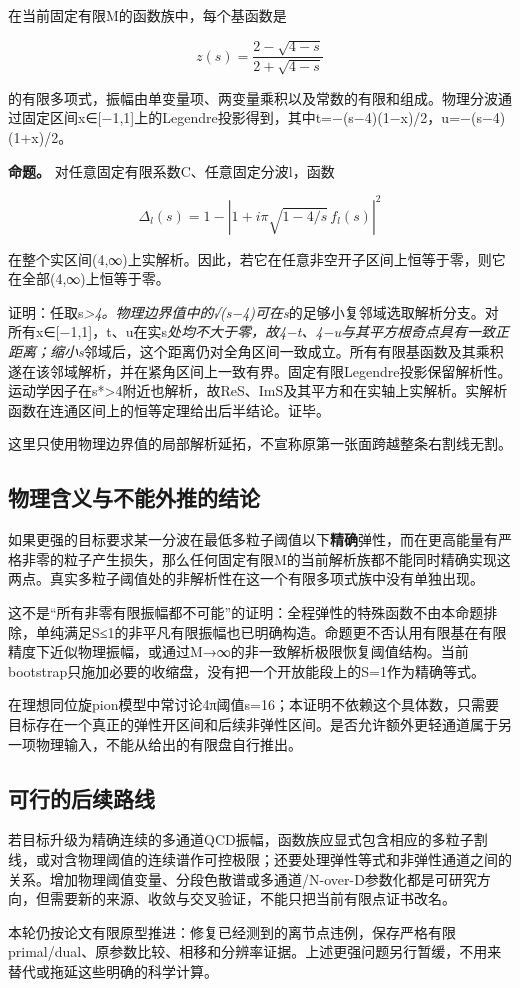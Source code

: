 \documentclass[
  10pt,
  a4paper,
]{article}
\begin{document}
在当前固定有限M的函数族中，每个基函数是

\[
z(s)=\frac{2-\sqrt{4-s}}{2+\sqrt{4-s}}
\]

的有限多项式，振幅由单变量项、两变量乘积以及常数的有限和组成。物理分波通过固定区间x∈{[}−1,1{]}上的Legendre投影得到，其中t=−(s−4)(1−x)/2，u=−(s−4)(1+x)/2。

\textbf{命题。} 对任意固定有限系数C、任意固定分波l，函数

\[
\Delta_l(s)=1-|1+i\pi\sqrt{1-4/s}\,f_l(s)|^2
\]

在整个实区间(4,∞)上实解析。因此，若它在任意非空开子区间上恒等于零，则它在全部(4,∞)上恒等于零。

证明：任取s\emph{\textgreater4。物理边界值中的√(s−4)可在s}的足够小复邻域选取解析分支。对所有x∈{[}−1,1{]}，t、u在实s\emph{处均不大于零，故4−t、4−u与其平方根奇点具有一致正距离；缩小s}邻域后，这个距离仍对全角区间一致成立。所有有限基函数及其乘积遂在该邻域解析，并在紧角区间上一致有界。固定有限Legendre投影保留解析性。运动学因子在s*\textgreater4附近也解析，故ReS、ImS及其平方和在实轴上实解析。实解析函数在连通区间上的恒等定理给出后半结论。证毕。

这里只使用物理边界值的局部解析延拓，不宣称原第一张面跨越整条右割线无割。

\subsection{物理含义与不能外推的结论}\label{ux7269ux7406ux542bux4e49ux4e0eux4e0dux80fdux5916ux63a8ux7684ux7ed3ux8bba}

如果更强的目标要求某一分波在最低多粒子阈值以下\textbf{精确}弹性，而在更高能量有严格非零的粒子产生损失，那么任何固定有限M的当前解析族都不能同时精确实现这两点。真实多粒子阈值处的非解析性在这一个有限多项式族中没有单独出现。

这不是``所有非零有限振幅都不可能''的证明：全程弹性的特殊函数不由本命题排除，单纯满足\textbar S\textbar≤1的非平凡有限振幅也已明确构造。命题更不否认用有限基在有限精度下近似物理振幅，或通过M→∞的非一致解析极限恢复阈值结构。当前bootstrap只施加必要的收缩盘，没有把一个开放能段上的\textbar S\textbar=1作为精确等式。

在理想同位旋pion模型中常讨论4π阈值s=16；本证明不依赖这个具体数，只需要目标存在一个真正的弹性开区间和后续非弹性区间。是否允许额外更轻通道属于另一项物理输入，不能从给出的有限盘自行推出。

\subsection{可行的后续路线}\label{ux53efux884cux7684ux540eux7eedux8defux7ebf}

若目标升级为精确连续的多通道QCD振幅，函数族应显式包含相应的多粒子割线，或对含物理阈值的连续谱作可控极限；还要处理弹性等式和非弹性通道之间的关系。增加物理阈值变量、分段色散谱或多通道/N-over-D参数化都是可研究方向，但需要新的来源、收敛与交叉验证，不能只把当前有限点证书改名。

本轮仍按论文有限原型推进：修复已经测到的离节点违例，保存严格有限primal/dual、原参数比较、相移和分辨率证据。上述更强问题另行暂缓，不用来替代或拖延这些明确的科学计算。
\end{document}
